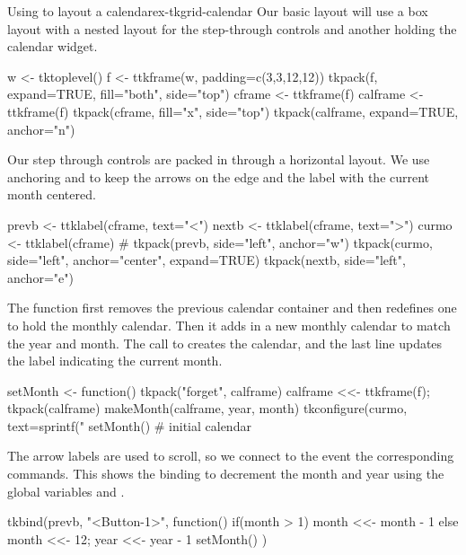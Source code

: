 \begin{example}{Using  to layout a calendar}{ex-tkgrid-calendar}
Our basic layout will use a box layout with a nested layout
for the step-through controls and another holding the calendar widget.
\begin{Schunk}
\begin{Sinput}
 w <- tktoplevel()
 f <- ttkframe(w, padding=c(3,3,12,12))
 tkpack(f, expand=TRUE, fill="both", side="top")
 cframe <- ttkframe(f)
 calframe <- ttkframe(f)
 tkpack(cframe, fill="x", side="top")
 tkpack(calframe, expand=TRUE, anchor="n")
\end{Sinput}
\end{Schunk}

Our step through controls are packed in through a horizontal
layout. We use anchoring and  to keep the arrows on the edge and the
label with the current month centered.
\begin{Schunk}
\begin{Sinput}
 prevb <- ttklabel(cframe, text="<")
 nextb <- ttklabel(cframe, text=">")
 curmo <- ttklabel(cframe)
 #
 tkpack(prevb, side="left", anchor="w")
 tkpack(curmo, side="left", anchor="center", expand=TRUE)
 tkpack(nextb, side="left", anchor="e")
\end{Sinput}
\end{Schunk}

The  function first removes the previous calendar
container and then
redefines one to hold the monthly calendar. Then it adds in a new
monthly calendar to match the year and month. The call to
 creates the calendar, and the last line updates the
label indicating the current month.
\begin{Schunk}
\begin{Sinput}
 setMonth <- function() {
   tkpack("forget", calframe)
   calframe <<- ttkframe(f); tkpack(calframe)
   makeMonth(calframe, year, month)
   tkconfigure(curmo, text=sprintf("%
 }
 setMonth()                              # initial calendar
\end{Sinput}
\end{Schunk}

The arrow labels are used to scroll, so we connect to the
 event the corresponding commands. This shows the
binding to decrement the month and year using the global variables
 and .
\begin{Schunk}
\begin{Sinput}
 tkbind(prevb, "<Button-1>", function() {
   if(month > 1) {
     month <<- month - 1
   } else {
     month <<- 12; year <<- year - 1
   }
   setMonth()
 })
\end{Sinput}
\end{Schunk}



\end{example}
